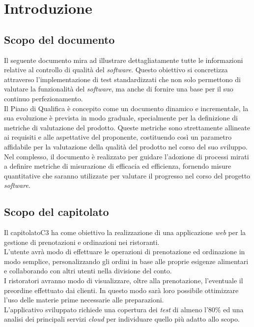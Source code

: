 \section{Introduzione}
\subsection{Scopo del documento}
Il seguente documento mira ad illustrare dettagliatamente tutte le informazioni relative al controllo di qualità del \textit{software}. 
Questo obiettivo si concretizza attraverso l'implementazione di test standardizzati che non solo permettono di valutare la funzionalità del \textit{software}, ma anche di fornire una base per il suo continuo perfezionamento. \\
Il Piano di Qualifica è concepito come un documento dinamico e incrementale, la sua evoluzione è prevista in modo graduale, specialmente per la definizione di metriche di valutazione del prodotto. 
Queste metriche sono strettamente allineate ai requisiti e alle aspettative del proponente, costituendo così un parametro affidabile per la valutazione della qualità del prodotto nel corso del suo sviluppo. \\
Nel complesso, il documento è realizzato per guidare l'adozione di processi mirati a definire metriche di misurazione di efficacia ed efficienza, fornendo misure quantitative che saranno utilizzate per valutare il progresso nel corso del progetto \textit{software}.

\subsection{Scopo del capitolato}
Il capitolato\g C3 ha come obiettivo la realizzazione di una applicazione \textit{web} per la gestione di prenotazioni e ordinazioni nei ristoranti. \\
L'utente avrà modo di effettuare le operazioni di prenotazione ed ordinazione in modo semplice, personalizzando gli ordini in base alle proprie esigenze alimentari e collaborando con altri utenti nella divisione del conto. \\
I ristoratori avranno modo di visualizzare, oltre alla prenotazione, l'eventuale il preordine effettuato dai clienti. 
In questo modo sarà loro possibile ottimizzare l'uso delle materie prime necessarie alle preparazioni. \\
L'applicativo sviluppato richiede una copertura dei \textit{test} di almeno l'$80\%$ ed una analisi dei principali servizi \textit{cloud} per individuare quello più adatto allo scopo.

